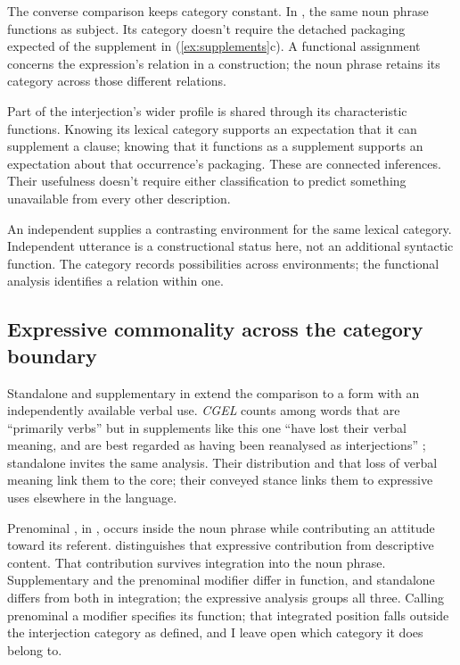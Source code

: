 \documentclass[12pt]{article}
\begin{document}
The converse comparison keeps category constant. In
, the same noun phrase
functions as subject. Its category doesn't require the detached packaging
expected of the supplement in (\ref{ex:supplements}c). A functional
assignment concerns the expression's relation in a construction; the
noun phrase retains its category across those different relations.

Part of the interjection's wider profile is shared through its
characteristic functions. Knowing its lexical category supports an expectation
that it can supplement a clause; knowing that it functions as a
supplement supports an expectation about that occurrence's packaging.
These are connected inferences. Their usefulness doesn't require either
classification to predict something unavailable from every other description.

An independent  supplies a contrasting environment for
the same lexical category. Independent utterance is a constructional
status here, not an additional syntactic function. The category records
possibilities across environments; the functional analysis identifies a
relation within one.

\subsection{Expressive commonality across the category boundary}\label{sec:damn-profiles}

Standalone  and supplementary  in
 extend the comparison to a form
with an independently available verbal use. \textit{CGEL} counts
 among words that are \enquote{primarily verbs} but in
supplements like this one \enquote{have lost their verbal meaning, and are
best regarded as having been reanalysed as interjections}
\citep[1361]{HuddlestonPullum2002}; standalone  invites the
same analysis. Their distribution and that loss of verbal meaning link them
to the core; their conveyed stance links them to
expressive uses elsewhere in the language.

Prenominal , in , occurs inside the
noun phrase while contributing an attitude toward its referent.
\textcite[171, 182]{potts2007} distinguishes that expressive contribution
from descriptive content. That contribution survives integration into the
noun phrase. Supplementary  and the prenominal modifier differ
in function, and standalone  differs from both in
integration; the expressive analysis groups all three. Calling prenominal
 a modifier specifies its function; that integrated position
falls outside the interjection category as defined, and I leave open which
category it does belong to.
\end{document}
